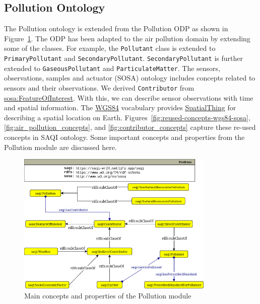 \subsection{Pollution Ontology}

The Pollution ontology is extended from the  Pollution ODP as shown in Figure~\ref{fig:pollution-module}. The ODP has been adapted to the air pollution domain by extending some of the classes. For example, the \texttt{Pollutant} class is extended to \texttt{PrimaryPollutant} and \texttt{SecondaryPollutant}. \texttt{SecondaryPollutant} is further extended to \texttt{GaseousPol\-lutant} and \texttt{ParticulateMatter}. The sensors, observations, samples and actuator (SOSA) ontology includes concepts related to sensors and their observations. We derived \texttt{Contributor} from \href{http://www.w3.org/ns/sosa/FeatureOfInterest}{sosa:FeatureOfInterest}. With this, we can describe sensor observations with time and spatial information. The \href{https://www.w3.org/2003/01/geo/wgs84_pos#}{WGS84} vocabulary provides \href{http://www.w3.org/2003/01/geo/wgs84_pos#SpatialThing}{SpatialThing} for describing a spatial location on Earth. Figures~\ref{fig:reused-concepts-wgs84-sosa}, \ref{fig:air_pollution_concepts}, and \ref{fig:contributor_concepts} capture these re-used concepts in SAQI ontology. Some important concepts and properties from the Pollution module are discussed here.

\begin{figure}[ht]
\centering
\includegraphics[height=6.8cm]{figures/ODP_subset_new.png}
\caption{Main concepts and properties of the Pollution module} 
\label{fig:pollution-module}
\end{figure}

 
